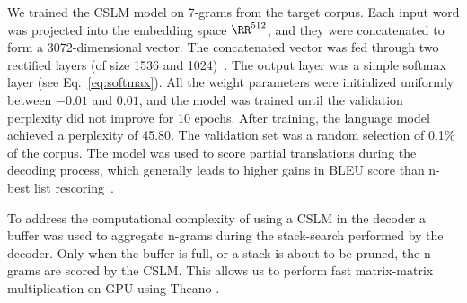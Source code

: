 We trained the CSLM model on 7-grams from the target corpus. Each input word
was projected into the embedding space $\RR^{512}$, and they were concatenated
to form a 3072-dimensional vector. The concatenated vector was fed through two
rectified layers (of size 1536 and 1024)~\mbox{\cite{Glorot+al-AI-2011-small}}.
The output layer was a simple softmax layer (see Eq.~\eqref{eq:softmax}). All
the weight parameters were initialized uniformly between $-0.01$ and $0.01$,
and the model was trained until the validation perplexity did not improve for
10 epochs. After training, the language model achieved a perplexity of 45.80.
The validation set was a random selection of 0.1\% of the corpus. The model was
used to score partial translations during the decoding process, which generally
leads to higher gains in BLEU score than n-best list
rescoring~\mbox{\cite{vaswanidecoding}}.

To address the computational complexity of using a CSLM in the decoder a buffer
was used to aggregate n-grams during the stack-search performed by the decoder.
Only when the buffer is full, or a stack is about to be pruned, the n-grams are
scored by the CSLM. This allows us to perform fast matrix-matrix multiplication
on GPU using Theano \mbox{\cite{bergstra+al:2010-scipy,Bastien-Theano-2012}}.

